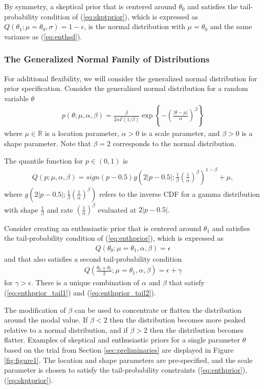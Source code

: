 \documentclass[12pt]{article}
\begin{document}
By symmetry, a skeptical prior that is centered around $\theta_0$ and satisfies the tail-probability condition of (\ref{eq:skptprior}), which is expressed as $Q(\theta_1;\mu=\theta_0,\sigma)=1-\epsilon$, is the normal distribution with $\mu=\theta_0$ and the same variance as (\ref{eq:enthsd}).

\subsubsection{The Generalized Normal Family of Distributions}
For additional flexibility, we will consider the generalized normal distribution for prior specification. Consider the generalized normal distribution for a random variable $\theta$ 
\begin{align}\label{eq:generalizednormalkernel}
p(\theta;\mu,\alpha,\beta)=\frac{\beta}{2\alpha\Gamma(1/\beta)}\exp\left\{-\left(\frac{|\theta-\mu|}{\alpha}\right)^\beta\right\}
\end{align} where $\mu\in\mathbb{R}$ is a location parameter, $\alpha>0$ is a scale parameter, and $\beta>0$ is a shape parameter. Note that $\beta=2$ corresponds to the normal distribution. 

The quantile function for $p\in (0,1)$ is 
\begin{align}
Q(p;\mu,\alpha,\beta)=sign(p-0.5) g\left(2|p-0.5|;\frac{1}{\beta}\left(\frac{1}{\alpha}\right)^{\beta}\right)^{1-\beta}+\mu,
\end{align}
where $g\left(2|p-0.5|;\frac{1}{\beta}\left(\frac{1}{\alpha}\right)^{\beta}\right)$ refers to the inverse CDF for a gamma distribution with shape $\frac{1}{\beta}$ and rate $(\frac{1}{\alpha})^\beta$ evaluated at $2|p-0.5|$.

Consider creating an enthusiastic prior that is centered around $\theta_1$ and satisfies the tail-probability condition of (\ref{eq:enthprior}), which is expressed as 
\begin{align}\label{eq:enthprior_tail1}
Q(\theta_0:\mu=\theta_1,\alpha,\beta)=\epsilon
\end{align} and that also satisfies a second tail-probability condition 
\begin{align}
Q\left(\frac{\theta_0+\theta_1}{2};\mu=\theta_1,\alpha,\beta\right)=\epsilon+\gamma \label{eq:enthprior_tail2}
\end{align}
for $\gamma>\epsilon$. There is a unique combination of $\alpha$ and $\beta$ that satisfy (\ref{eq:enthprior_tail1}) and (\ref{eq:enthprior_tail2}).


The modification of $\beta$ can be used to concentrate or flatten the distribution around the modal value. If $\beta<2$ then the distribution becomes more peaked relative to a normal distribution, and if $\beta>2$ then the distribution becomes flatter. Examples of skeptical and enthusiastic priors for a single parameter $\theta$ based on the trial from Section \ref{sec:preliminaries} are displayed in Figure \ref{fig:figure1}. The location and shape parameters are pre-specified, and the scale parameter is chosen to satisfy the tail-probability constraints (\ref{eq:enthprior}), (\ref{eq:skptprior}).
\end{document}
